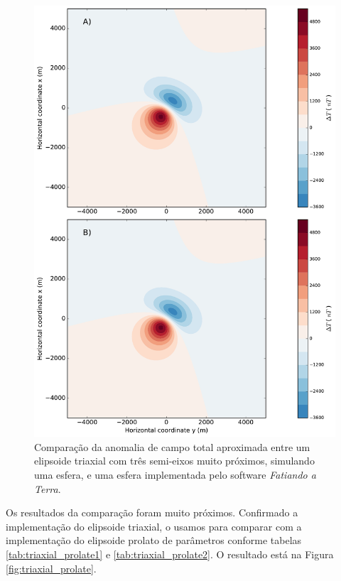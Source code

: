 \begin{figure}[hbt!]
	\centering \includegraphics[width=14 cm,height=21 cm]{figures/ellipsoid_triaxial_sphere}
	\caption[Comparação da anomalia de campo total aproximada entre um elipsoide triaxial com três semi-eixos muito próximos, simulando uma esfera, 
		e uma esfera.]{Comparação da anomalia de campo total aproximada entre um elipsoide triaxial com três semi-eixos muito próximos, simulando uma esfera, e uma esfera implementada pelo software \textit{Fatiando a Terra}.}
	\label{fig:triaxial_sphere}
\end{figure}

Os resultados da comparação foram muito próximos. Confirmado a implementação do elipsoide triaxial, o usamos para comparar com a implementação do elipsoide prolato de parâmetros conforme tabelas \ref{tab:triaxial_prolate1} e \ref{tab:triaxial_prolate2}. O resultado está na Figura \ref{fig:triaxial_prolate}.

